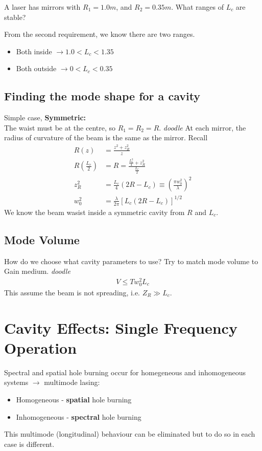 \documentclass[a4paper, 11pt, normalem]{report}
\begin{document}
\begin{example}
    A laser has mirrors with $R_1=1.0m$, and $R_2 = 0.35m$.
    What ranges of $L_c$ are stable?

    From the second requirement, we know there are two ranges.
    \begin{itemize}
        \item Both inside $\to 1.0 < L_c < 1.35$
        \item Both outside $\to 0 < L_c < 0.35$
    \end{itemize}
\end{example}

\section{Finding the mode shape for a cavity}
Simple case, \textbf{Symmetric:}\\
The waist must be at the centre, so $R_1=R_2=R$.
\textit{doodle}
At each mirror, the radius of curvature of the beam is the same as the mirror. 
Recall
\begin{align}
    R(z) &=\frac{z^2+z_R^2}{z} \\
    R\left(\frac{L_c}{2}\right) &= R = \frac{\frac{L^2_c}{4}+z_R^2}{\frac{L_c}{2}} \\
    z_R^2 &= \frac{L_c}{4}(2R-L_c) \equiv \left(\frac{\pi w_0^2}{\lambda}\right)^2 \\
    w_0^2 &= \frac{\lambda}{2\pi}\left[L_c(2R-L_c)\right]^{1/2} 
\end{align}
We know the beam wasist inside a symmetric cavity from $R$ and $L_c$.

\section{Mode Volume}
How do we choose what cavity parameters to use?
Try to match mode volume to Gain medium. 
\textit{doodle}
\begin{align}
    V \leq Tw_0^2L_c
\end{align}
This assume the beam is not spreading, i.e. $Z_R \gg L_c$.

\chapter{Cavity Effects: Single Frequency Operation}
Spectral and spatial hole burning occur for homegeneous and inhomogeneous systems $\to$ multimode lasing:
\begin{itemize}
    \item Homogeneous - \textbf{spatial} hole burning
    \item Inhomogeneous - \textbf{spectral} hole burning
\end{itemize}
This multimode (longitudinal) behaviour can be eliminated but to do so in each case is different.
\end{document}
